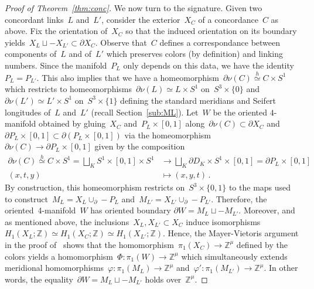 \documentclass{amsart}
\newcommand{\Z}{\mathbb{Z}}
\theoremstyle{definition}
\theoremstyle{remark}
\begin{document}
\begin{proof}[Proof of Theorem~\ref{thm:conc}]
	\medskip
	
	We now turn to the signature. Given two concordant links~$L$ and~$L'$, consider the exterior~$X_C$ of a concordance~$C$ as above. Fix the orientation of~$X_C$ so that the induced orientation on its boundary yields~$X_L\sqcup -X_{L'}\subset\partial X_C$. Observe that~$C$ defines a correspondance between components of~$L$
	and of~$L'$ which preserves colors (by definition) and linking numbers. Since the manifold~$P_L$ only depends on this
	data, we have the identity~$P_L=P_{L'}$.
	This also implies that we have a homeomorphism~$\partial\nu(C)\stackrel{h}{\simeq} C\times S^1$ which restricts to homeomorphisms~$\partial\nu(L)\simeq L\times S^1$ on~$S^3\times\{0\}$ and~$\partial\nu(L')\simeq L'\times S^1$
	on~$S^3\times\{1\}$ defining the standard meridians and Seifert longitudes of~$L$ and~$L'$ (recall Section~\ref{sub:ML}). Let~$W$ be the oriented $4$-manifold obtained by gluing~$X_C$ and~$P_L\times[0,1]$ along~$\partial\nu(C)\subset \partial X_C$ and~$\partial P_L\times[0,1]\subset\partial(P_L\times[0,1])$ via the homeomorphism~$\partial\nu(C)\to\partial P_L\times[0,1]$ given by the composition
	\begin{align*}
		\partial\nu(C)\stackrel{h}{\simeq}  C\times S^1= \bigsqcup_K S^1\times [0,1]\times S^1&\longrightarrow \bigsqcup_K\partial D_K\times S^1\times[0,1]=\partial P_L\times[0,1]\\
		(x,t,y)&\longmapsto(x,y,t)\,.
	\end{align*}
	By construction, this homeomorphism restricts on~$S^3\times\{0,1\}$ to the maps used to construct~$M_L=X_L\cup_\partial -P_L$ and~$M_{L'}=X_{L'}\cup_\partial -P_{L'}$. Therefore, the oriented~4-manifold~$W$ has oriented
	boundary $\partial W=M_L\sqcup -M_{L'}$.
	Moreover, and as mentioned above, the inclusions~$X_L,X_{L'}\subset X_C$ induce isomorphisms~$H_1(X_L;\Z)\simeq H_1(X_C;\Z)\simeq H_1(X_{L'};\Z)$. Hence, the Mayer-Vietoris argument in the proof of~\cite[Lemma~2.11]{CMP23} shows that the homomorphism~$\pi_1(X_C)\to\Z^\mu$ defined by the colors yields a homomorphism~$\Phi\colon\pi_1(W)\to\Z^\mu$ which simultaneously extends meridional homomorphisms~$\varphi\colon\pi_1(M_L)\to\Z^\mu$ and~$\varphi'\colon\pi_1(M_{L'})\to\Z^\mu$. In other words, the equality~$\partial W=M_L\sqcup -M_{L'}$ holds over~$\Z^\mu$.
	

\end{proof}
\end{document}
